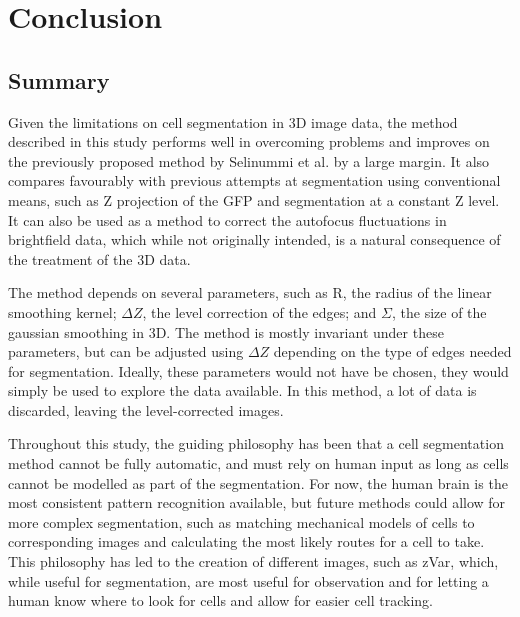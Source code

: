
\chapter{Conclusion}

\ifpdf
    \graphicspath{{Chapter6/Figs/Raster/}{Chapter6/Figs/PDF/}{Chapter6/Figs/}}
\else
    \graphicspath{{Chapter6/Figs/Vector/}{Chapter6/Figs/}}
\fi

\section{Summary}

Given the limitations on cell segmentation in 3D image data, the method described in this study performs well in overcoming problems and improves on the previously proposed method by Selinummi et al. by a large margin. It also compares favourably with previous attempts at segmentation using conventional means, such as Z projection of the GFP and segmentation at a constant Z level. It can also be used as a method to correct the autofocus fluctuations in brightfield data, which while not originally intended, is a natural consequence of the treatment of the 3D data.

The method depends on several parameters, such as R, the radius of the linear smoothing kernel; $\Delta Z$, the level correction of the edges; and $\Sigma$, the size of the gaussian smoothing in 3D. The method is mostly invariant under these parameters, but can be adjusted using $\Delta Z$ depending on the type of edges needed for segmentation. Ideally, these parameters would not have be chosen, they would simply be used to explore the data available. In this method, a lot of data is discarded, leaving the level-corrected images.

Throughout this study, the guiding philosophy has been that a cell segmentation method cannot be fully automatic, and must rely on human input as long as cells cannot be modelled as part of the segmentation. For now, the human brain is the most consistent pattern recognition available, but future methods could allow for more complex segmentation, such as matching mechanical models of cells to corresponding images and calculating the most likely routes for a cell to take. This philosophy has led to the creation of different images, such as zVar, which, while useful for segmentation, are most useful for observation and for letting a human know where to look for cells and allow for easier cell tracking.

